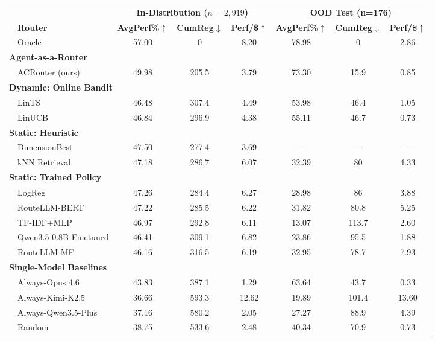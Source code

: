 \begin{tabular}{@{}l l ccc ccc@{}}
\toprule
& & \multicolumn{3}{c}{\textbf{In-Distribution ($n{=}2{,}919$)}} & \multicolumn{3}{c}{\textbf{OOD Test (n=176)}} \\
\cmidrule(lr){3-5} \cmidrule(lr){6-8}
& \textbf{Router} & \textbf{AvgPerf\%}$\uparrow$ & \textbf{CumReg}$\downarrow$ & \textbf{Perf/\$}$\uparrow$ & \textbf{AvgPerf\%}$\uparrow$ & \textbf{CumReg}$\downarrow$ & \textbf{Perf/\$}$\uparrow$ \\
\midrule
& Oracle & 57.00 & 0 & 8.20 & 78.98 & 0 & 2.86 \\
\midrule
\multicolumn{8}{l}{\textbf{Agent-as-a-Router}} \\
\cmidrule(l){1-8}
& ACRouter (ours) & 49.98 & 205.5 & 3.79 & 73.30 & 15.9 & 0.85 \\
\midrule
\multicolumn{8}{l}{\textbf{Dynamic: Online Bandit}} \\
\cmidrule(l){1-8}
& LinTS & 46.48 & 307.4 & 4.49 & 53.98 & 46.4 & 1.05 \\
& LinUCB & 46.84 & 296.9 & 4.38 & 55.11 & 46.7 & 0.73 \\
\midrule
\multicolumn{8}{l}{\textbf{Static: Heuristic}} \\
\cmidrule(l){1-8}
& DimensionBest & 47.50 & 277.4 & 3.69 & --- & --- & --- \\
& kNN Retrieval & 47.18 & 286.7 & 6.07 & 32.39 & 80 & 4.33 \\
\midrule
\multicolumn{8}{l}{\textbf{Static: Trained Policy}} \\
\cmidrule(l){1-8}
& LogReg & 47.26 & 284.4 & 6.27 & 28.98 & 86 & 3.88 \\
& RouteLLM-BERT & 47.22 & 285.5 & 6.22 & 31.82 & 80.8 & 5.25 \\
& TF-IDF+MLP & 46.97 & 292.8 & 6.11 & 13.07 & 113.7 & 2.60 \\
& Qwen3.5-0.8B-Finetuned & 46.41 & 309.1 & 6.82 & 23.86 & 95.5 & 1.88 \\
& RouteLLM-MF & 46.16 & 316.5 & 6.19 & 32.95 & 78.7 & 7.93 \\
\midrule
\multicolumn{8}{l}{\textbf{Single-Model Baselines}} \\
\cmidrule(l){1-8}
& Always-Opus 4.6 & 43.83 & 387.1 & 1.29 & 63.64 & 43.7 & 0.33 \\
& Always-Kimi-K2.5 & 36.66 & 593.3 & 12.62 & 19.89 & 101.4 & 13.60 \\
& Always-Qwen3.5-Plus & 37.16 & 580.2 & 2.05 & 27.27 & 88.9 & 4.39 \\
& Random & 38.75 & 533.6 & 2.48 & 40.34 & 70.9 & 0.73 \\
\bottomrule
\end{tabular}
